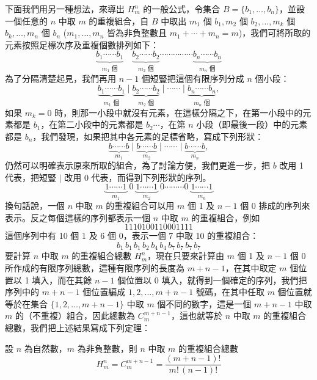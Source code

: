 下面我們用另一種想法，來導出 $H_m^n$ 的一般公式，令集合 $B = \{b_1, \ldots, b_n\}$，並設一個任意的 $n$ 中取 $m$ 的重複組合，自 $B$ 中取出 $m_1$ 個 $b_1, m_2$ 個 $b_2, \ldots, m_k$ 個 $b_k, \ldots, m_n$ 個 $b_n$ ($m_1, \ldots, m_n$ 皆為非負整數且 $m_1 + \cdots + m_n = m$)，我們可將所取的元素按照足標次序及重複個數排列如下：
\[
\underbrace{b_1 \cdots\cdots b_1}_{m_1 \text{ 個}} \quad \underbrace{b_2 \cdots\cdots b_2}_{m_2 \text{ 個}} \cdots\cdots\cdots\cdots\cdots \underbrace{b_n \cdots\cdots b_n}_{m_n \text{ 個}}
\]
為了分隔清楚起見，我們再用 $n-1$ 個短豎把這個有限序列分成 $n$ 個小段：
\[
\underbrace{b_1 \cdots\cdots b_1}_{m_1 \text{ 個}} \;\Big|\; \underbrace{b_2 \cdots\cdots b_2}_{m_2 \text{ 個}} \;\Big|\; \cdots\cdots \;\Big|\; \underbrace{b_n \cdots\cdots b_n}_{m_n \text{ 個}},
\]
如果 $m_k = 0$ 時，則那一小段中就沒有元素，在這樣分隔之下，在第一小段中的元素都是 $b_1$，在第二小段中的元素都是 $b_2 \cdots$，在第 $n$ 小段（即最後一段）中的元素都是 $b_n$，我們發現，如果把其中各元素的足標省略，寫成下列形狀：
\[
\underbrace{b \cdots\cdots b}_{m_1} \;\Big|\; \underbrace{b \cdots\cdots b}_{m_2} \;\Big|\; \cdots\cdots \;\Big|\; \underbrace{b \cdots\cdots b}_{m_n},
\]
仍然可以明確表示原來所取的組合，為了討論方便，我們更進一步，把 $b$ 改用 1 代表，把短豎 $\mid$ 改用 0 代表，而得到下列形狀的序列。
\[
\underbrace{1 \cdots\cdots 1}_{m_1} \;0\; \underbrace{1 \cdots\cdots 1}_{m_2} \;0 \cdots\cdots\cdots 0\; \underbrace{1 \cdots\cdots 1}_{m_n}
\]
換句話說，一個 $n$ 中取 $m$ 的重複組合可以用 $m$ 個 1 及 $n-1$ 個 0 排成的序列來表示。反之每個這樣的序列都表示一個 $n$ 中取 $m$ 的重複組合，例如
\[
1110100110001111
\]
這個序列中有 10 個 1 及 6 個 0，表示一個 7 中取 10 的重複組合：
\[
b_1\, b_1\, b_1\, b_2\, b_4\, b_4\, b_7\, b_7\, b_7\, b_7
\]
要計算 $n$ 中取 $m$ 的重複組合總數 $H_m^n$，現在只要來計算由 $m$ 個 1 及 $n-1$ 個 0 所作成的有限序列總數，這種有限序列的長度為 $m+n-1$，在其中取定 $m$ 個位置以 1 填入，而在其餘 $n-1$ 個位置以 0 填入，就得到一個確定的序列，我們把序列中的 $m+n-1$ 個位置編成 $1, 2, \ldots, m+n-1$ 號碼，在其中任取 $m$ 個位置就等於在集合 $\{1, 2, \ldots, m+n-1\}$ 中取 $m$ 個不同的數字，這是一個 $m+n-1$ 中取 $m$ 的（不重複）組合，因此總數為 $C_m^{m+n-1}$，這也就等於 $n$ 中取 $m$ 的重複組合總數，我們把上述結果寫成下列定理：

\medskip
\begin{theorem}\label{thm:b5s-2-9}
設 $n$ 為自然數，$m$ 為非負整數，則 $n$ 中取 $m$ 的重複組合總數
\begin{equation*}
H_m^n = C_m^{m+n-1} = \frac{(m+n-1)!}{m!\, (n-1)!}
\end{equation*}
\end{theorem}

